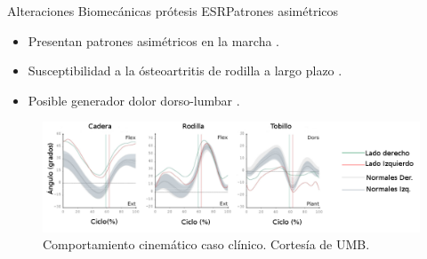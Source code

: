 \documentclass[10pt]{beamer}
\begin{document}
\begin{frame}{Alteraciones Biomecánicas prótesis ESR}{Patrones asimétricos}

\begin{alertblock}{}

\begin{itemize}
\item {\scriptsize{}Presentan patrones asimétricos en la marcha \cite{Au2009,Martinez-Villalpando2011,Hill2013a,Bateni2002}.}{\scriptsize \par}
\item {\scriptsize{}Susceptibilidad a la ósteoartritis de rodilla a largo
plazo \cite{Grabowski2013}.}{\scriptsize \par}
\item {\scriptsize{}Posible generador dolor dorso-lumbar \cite{Devan2014}.}{\scriptsize \par}
\end{itemize}
\begin{figure}
\begin{centering}
\includegraphics[scale=0.25]{Feathergraphics/Henry}
\par\end{centering}
\caption{Comportamiento cinemático caso clínico. Cortesía de UMB.}

\end{figure}

\end{alertblock}
\end{frame}
\end{document}
